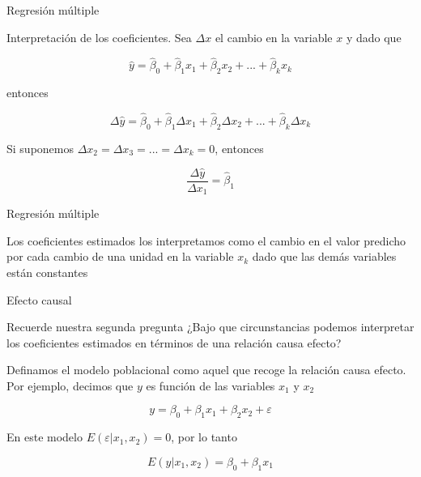 \documentclass{beamer}
\begin{document}
\begin{frame}{Regresión múltiple}

Interpretación de los coeficientes. Sea $\Delta x$ el cambio en la variable $x$ y dado que

\begin{equation*}
    \hat{y}=\hat{\beta}_0+\hat{\beta}_1x_1+\hat{\beta}_2x_2+...+\hat{\beta}_kx_k
\end{equation*}

entonces

\begin{equation*}
    \Delta\hat{y}=\hat{\beta}_0+\hat{\beta}_1\Delta x_1+\hat{\beta}_2\Delta x_2+...+\hat{\beta}_k\Delta x_k
\end{equation*}

Si suponemos $\Delta x_2=\Delta x_3=...=\Delta x_k=0$, entonces

\begin{equation*}
    \dfrac{\Delta \hat{y}}{\Delta x_1}=\hat{\beta}_1
\end{equation*}
    
\end{frame}

\begin{frame}{Regresión múltiple}

Los coeficientes estimados los interpretamos como el cambio en el valor predicho por cada cambio de una unidad en la variable $x_k$ dado que las demás variables están constantes 
    
\end{frame}

\begin{frame}{Efecto causal}

Recuerde nuestra segunda pregunta ¿Bajo que circunstancias podemos interpretar los coeficientes estimados en términos de una relación causa efecto?

Definamos el modelo poblacional como aquel que recoge la relación causa efecto. Por ejemplo, decimos que $y$ es función de las variables $x_1$ y $x_2$

\begin{equation*}
    y=\beta_0+\beta_1x_1+\beta_2x_2+\varepsilon
\end{equation*}

En este modelo $E(\varepsilon|x_1,x_2)=0$, por lo tanto 

\begin{equation*}
    E(y|x_1,x_2)=\beta_0+\beta_1x_1
\end{equation*}
  
\end{frame}
\end{document}
